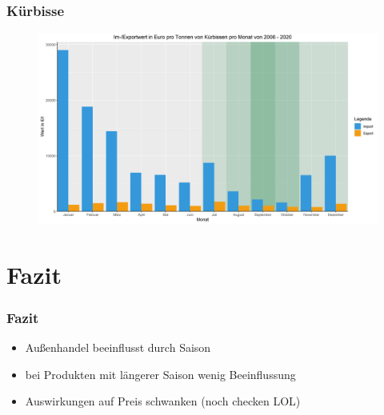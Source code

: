 \documentclass{beamer}
\begin{document}
\begin{frame}
	\frametitle{Kürbisse}
	\begin{figure}[b]
		\centering
		\includegraphics[scale=0.35]{Kuerbissen_monthly_Euro_per_weight_Im-Export}
	\end{figure}
\end{frame}

\section{Fazit}
\begin{frame}
	\frametitle{Fazit}
	\begin{itemize}
		\item Außenhandel beeinflusst durch Saison
		\item bei Produkten mit längerer Saison wenig Beeinflussung
		\item Auswirkungen auf Preis schwanken (noch checken LOL)
	\end{itemize}
\end{frame}


\end{document}
